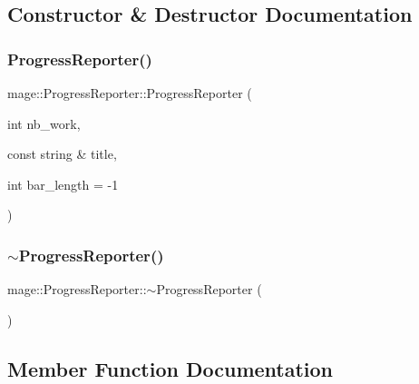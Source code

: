 \subsection{Constructor \& Destructor Documentation}
\hypertarget{classmage_1_1_progress_reporter_a8820bc575fee3e8cbc217707d4931fc1}{}\label{classmage_1_1_progress_reporter_a8820bc575fee3e8cbc217707d4931fc1} 
\subsubsection{\texorpdfstring{Progress\+Reporter()}{ProgressReporter()}}
{\footnotesize\ttfamily mage\+::\+Progress\+Reporter\+::\+Progress\+Reporter (\begin{DoxyParamCaption}\item[{int}]{nb\+\_\+work,  }\item[{const string \&}]{title,  }\item[{int}]{bar\+\_\+length = {\ttfamily -\/1} }\end{DoxyParamCaption})}

\hypertarget{classmage_1_1_progress_reporter_aa543239c6dd4474a77cf4cf6904c1b26}{}\label{classmage_1_1_progress_reporter_aa543239c6dd4474a77cf4cf6904c1b26} 
\subsubsection{\texorpdfstring{$\sim$\+Progress\+Reporter()}{~ProgressReporter()}}
{\footnotesize\ttfamily mage\+::\+Progress\+Reporter\+::$\sim$\+Progress\+Reporter (\begin{DoxyParamCaption}{ }\end{DoxyParamCaption})\hspace{0.3cm}{\ttfamily [virtual]}}



\subsection{Member Function Documentation}
\hypertarget{classmage_1_1_progress_reporter_a11d758647ac2082bc296ab53a7454eaa}{}\label{classmage_1_1_progress_reporter_a11d758647ac2082bc296ab53a7454eaa} 
